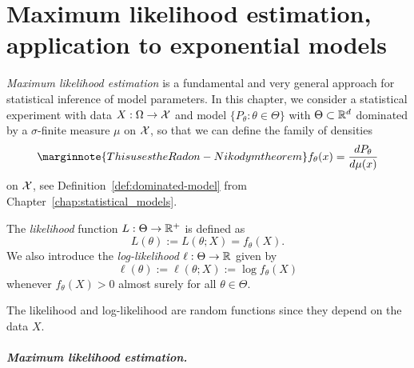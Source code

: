 


\setchapterpreamble[u]{\margintoc}
\chapter{Maximum likelihood estimation, application to exponential models}
\label{chap:maximum_likelihood_estimation}


\emph{Maximum likelihood estimation} is a fundamental and very general approach for statistical inference of model parameters.
In this chapter, we consider a statistical experiment with data $X : \Omega \rightarrow \operatorname{{\mathcal X}}$ and model $\{ P_\theta : \theta \in \Theta \}$ with $\Theta \subset \mathbb R^d$ dominated by a $\sigma$-finite measure $\mu$ on $\operatorname{{\mathcal X}}$, so that we can define the family of densities 
\begin{equation*}
	\marginnote{This uses the Radon-Nikodym theorem}
	f_\theta(x) = \frac{d P_\theta}{d \mu (x)} 
\end{equation*}
on $\operatorname{{\mathcal X}}$, see Definition~\ref{def:dominated-model} from Chapter~\ref{chap:statistical_models}.
\begin{definition}
	The \emph{likelihood} function $L : \Theta \rightarrow \mathbb R^+$ is defined as
	\begin{equation*}
		L(\theta) := L(\theta; X) = f_\theta(X).
	\end{equation*}
	We also introduce the \emph{log-likelihood} $\ell : \Theta \rightarrow \mathbb R$ given by
	\begin{equation*}
		\ell(\theta) := \ell(\theta; X) := \log f_\theta(X)
	\end{equation*}
	whenever $f_\theta(X) > 0$ almost surely for all $\theta \in \Theta$.
\end{definition}
The likelihood and log-likelihood are random functions since they depend on the data $X$.


\paragraph{Maximum likelihood estimation.} %

